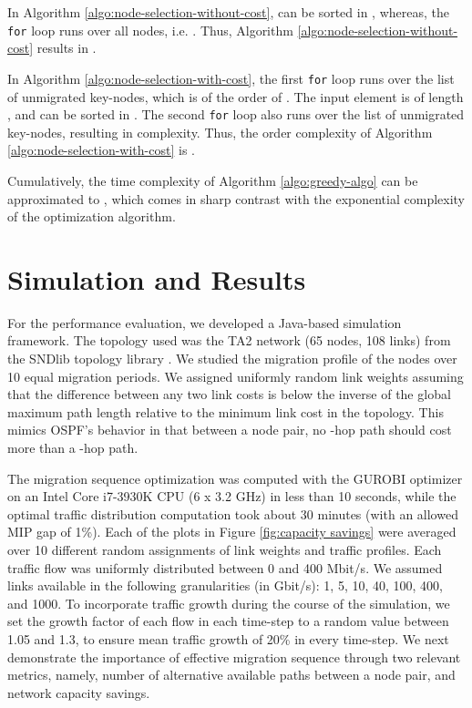 \documentclass[conference]{IEEEtran}
\begin{document}
\par In Algorithm \ref{algo:node-selection-without-cost},  can be sorted in
, whereas, the \texttt{for} loop runs over all nodes, i.e. .
Thus, Algorithm \ref{algo:node-selection-without-cost} results in .

\par In Algorithm \ref{algo:node-selection-with-cost}, the first \texttt{for}
loop runs over the list of unmigrated key-nodes, which is of the order of
. The input element  is of length , and can be sorted in
. The second \texttt{for} loop also runs over the list of
unmigrated key-nodes, resulting in  complexity. Thus, the order
complexity of Algorithm \ref{algo:node-selection-with-cost} is .

\par Cumulatively, the time complexity of Algorithm \ref{algo:greedy-algo} can
be approximated to , which comes in sharp contrast with
the exponential complexity of the optimization algorithm.

\section{Simulation and Results}\label{sec:results}
\par For the performance evaluation, we developed a Java-based simulation
framework. The topology used was the TA2 network (65 nodes, 108 links) from the
SNDlib topology library \cite{sndlib}.
We studied the migration profile of the nodes over 10 equal migration periods. We
assigned uniformly random link weights assuming that the difference between any
two link costs is below the inverse of the global maximum path length relative
to the minimum link cost in the topology. This mimics OSPF's behavior in that
between a node pair, no -hop path should cost more than a -hop path.

The migration sequence optimization was computed with the GUROBI optimizer on an
Intel Core i7-3930K CPU (6 x 3.2 GHz) in less than 10 seconds, while the optimal
traffic distribution computation took about 30 minutes (with an allowed MIP
gap of 1\%). Each of the plots in Figure \ref{fig:capacity
savings} were averaged over 10 different random assignments of link weights and
traffic profiles. Each traffic flow was uniformly distributed between 0 and 400
Mbit/s. We assumed links available in the following granularities (in Gbit/s):
1, 5, 10, 40, 100, 400, and 1000. To incorporate traffic growth during the
course of the simulation, we set the growth factor of each flow in each
time-step to a random value between 1.05 and 1.3, to ensure mean traffic growth of 20\% in
every time-step. We next demonstrate the importance of effective migration
sequence through two relevant metrics, namely, number of alternative available
paths between a node pair, and network capacity savings.
\end{document}
